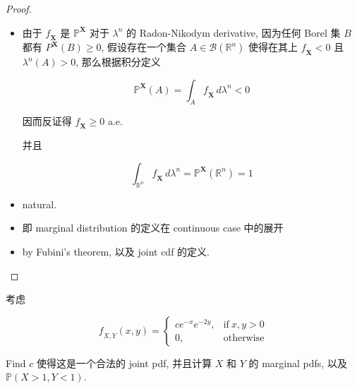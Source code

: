 \begin{proof}

\begin{itemize}
\item
  由于 \(\mathit{f}_{\mathbf{X}}\) 是 \(\mathbb{P}^{\mathbf{X}}\) 对于 \(\mathit{\lambda}^{\mathit{n}}\) 的 Radon-Nikodym derivative, 因为任何 Borel 集 \(\mathit{B}\) 都有 \(\mathit{P}^{\mathbf{X}}(\mathit{B}) \geq 0\), 假设存在一个集合 \(\mathit{A} \in \mathcal{B}(\mathbb{R}^{\mathit{n}})\) 使得在其上 \(\mathit{f}_{\mathbf{X}} < 0\) 且 \(\mathit{\lambda}^{\mathit{n}}(\mathit{A}) > 0\), 那么根据积分定义

  \[\mathbb{P}^{\mathbf{X}}(\mathit{A}) = \int_{\mathit{A}}\mathit{f}_{\mathbf{X}}\,\mathit{d}\mathit{\lambda}^{\mathit{n}} < 0\]

  因而反证得 \(\mathit{f}_{\mathbf{X}} \geq 0\) a.e.

  并且

  \[\int_{\mathbb{R}^{\mathit{n}}}\mathit{f}_{\mathbf{X}}\,\mathit{d}\mathit{\lambda}^{\mathit{n}} = \mathbb{P}^{\mathbf{X}}(\mathbb{R}^{\mathit{n}}) = 1\]
\item
  natural.
\item
  即 marginal distribution 的定义在 continuous case 中的展开
\item
  by Fubini's theorem, 以及 joint cdf 的定义.
\end{itemize}

\end{proof}

\begin{example}

考虑

\[\mathit{f}_{\mathit{X},\mathit{Y}}(\mathit{x},\mathit{y}) = \left\{ \begin{matrix}
{\mathit{c}\mathit{e}^{- \mathit{x}}\mathit{e}^{- 2\mathit{y}},} & {\text{if}\ \mathit{x},\mathit{y} > 0} \\
{0,} & \text{otherwise}
\end{matrix} \right.\]

Find \(\mathit{c}\) 使得这是一个合法的 joint pdf, 并且计算 \(\mathit{X}\) 和 \(\mathit{Y}\) 的 marginal pdfs, 以及 \(\mathbb{P}(\mathit{X} > 1,\mathit{Y} < 1)\).

\end{example}

